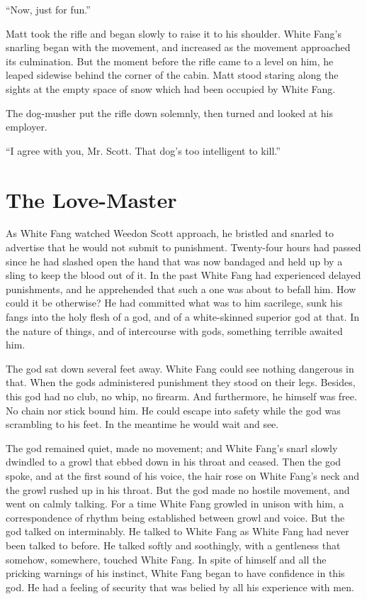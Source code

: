 \documentclass[10pt]{book}
\begin{document}
“Now, just for fun.”

Matt took the rifle and began slowly to raise it to his shoulder. White
Fang’s snarling began with the movement, and increased as the movement
approached its culmination. But the moment before the rifle came to a
level on him, he leaped sidewise behind the corner of the cabin. Matt
stood staring along the sights at the empty space of snow which had
been occupied by White Fang.

The dog-musher put the rifle down solemnly, then turned and looked at
his employer.

“I agree with you, Mr. Scott. That dog’s too intelligent to kill.”

\chapter{The Love-Master}

As White Fang watched Weedon Scott approach, he bristled and snarled to
advertise that he would not submit to punishment. Twenty-four hours had
passed since he had slashed open the hand that was now bandaged and
held up by a sling to keep the blood out of it. In the past White Fang
had experienced delayed punishments, and he apprehended that such a one
was about to befall him. How could it be otherwise? He had committed
what was to him sacrilege, sunk his fangs into the holy flesh of a god,
and of a white-skinned superior god at that. In the nature of things,
and of intercourse with gods, something terrible awaited him.

The god sat down several feet away. White Fang could see nothing
dangerous in that. When the gods administered punishment they stood on
their legs. Besides, this god had no club, no whip, no firearm. And
furthermore, he himself was free. No chain nor stick bound him. He
could escape into safety while the god was scrambling to his feet. In
the meantime he would wait and see.

The god remained quiet, made no movement; and White Fang’s snarl slowly
dwindled to a growl that ebbed down in his throat and ceased. Then the
god spoke, and at the first sound of his voice, the hair rose on White
Fang’s neck and the growl rushed up in his throat. But the god made no
hostile movement, and went on calmly talking. For a time White Fang
growled in unison with him, a correspondence of rhythm being
established between growl and voice. But the god talked on
interminably. He talked to White Fang as White Fang had never been
talked to before. He talked softly and soothingly, with a gentleness
that somehow, somewhere, touched White Fang. In spite of himself and
all the pricking warnings of his instinct, White Fang began to have
confidence in this god. He had a feeling of security that was belied by
all his experience with men.
\end{document}
